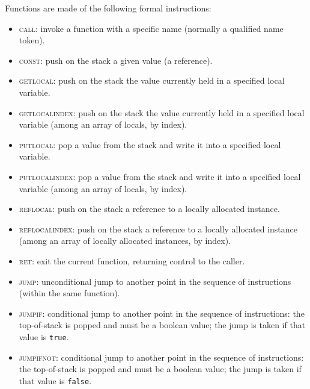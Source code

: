 Functions are made of the following formal instructions:
\begin{itemize}

    \item \textsc{call}: invoke a function with a specific name
    (normally a qualified name token).

    \item \textsc{const}: push on the stack a given value (a reference).

    \item \textsc{getlocal}: push on the stack the value currently held in
    a specified local variable.

    \item \textsc{getlocalindex}: push on the stack the value currently held
    in a specified local variable (among an array of locals, by index).

    \item \textsc{putlocal}: pop a value from the stack and write it into
    a specified local variable.

    \item \textsc{putlocalindex}: pop a value from the stack and write
    it into a specified local variable (among an array of locals, by
    index).

    \item \textsc{reflocal}: push on the stack a reference to a
    locally allocated instance.

    \item \textsc{reflocalindex}: push on the stack a reference to a
    locally allocated instance (among an array of locally allocated
    instances, by index).

    \item \textsc{ret}: exit the current function, returning control to
    the caller.

    \item \textsc{jump}: unconditional jump to another point in the
    sequence of instructions (within the same function).

    \item \textsc{jumpif}: conditional jump to another point in the
    sequence of instructions: the top-of-stack is popped and must be
    a boolean value; the jump is taken if that value is \verb|true|.

    \item \textsc{jumpifnot}: conditional jump to another point in the
    sequence of instructions: the top-of-stack is popped and must be
    a boolean value; the jump is taken if that value is \verb|false|.

\end{itemize}

